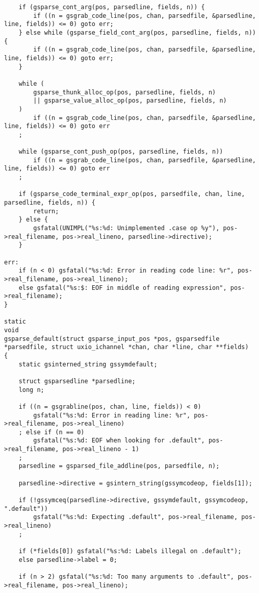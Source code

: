 \documentclass{report}
\begin{document}
\begin{verbatim}
    if (gsparse_cont_arg(pos, parsedline, fields, n)) {
        if ((n = gsgrab_code_line(pos, chan, parsedfile, &parsedline, line, fields)) <= 0) goto err;
    } else while (gsparse_field_cont_arg(pos, parsedline, fields, n)) {
        if ((n = gsgrab_code_line(pos, chan, parsedfile, &parsedline, line, fields)) <= 0) goto err;
    }

    while (
        gsparse_thunk_alloc_op(pos, parsedline, fields, n)
        || gsparse_value_alloc_op(pos, parsedline, fields, n)
    )
        if ((n = gsgrab_code_line(pos, chan, parsedfile, &parsedline, line, fields)) <= 0) goto err
    ;

    while (gsparse_cont_push_op(pos, parsedline, fields, n))
        if ((n = gsgrab_code_line(pos, chan, parsedfile, &parsedline, line, fields)) <= 0) goto err
    ;

    if (gsparse_code_terminal_expr_op(pos, parsedfile, chan, line, parsedline, fields, n)) {
        return;
    } else {
        gsfatal(UNIMPL("%s:%d: Unimplemented .case op %y"), pos->real_filename, pos->real_lineno, parsedline->directive);
    }

err:
    if (n < 0) gsfatal("%s:%d: Error in reading code line: %r", pos->real_filename, pos->real_lineno);
    else gsfatal("%s:$: EOF in middle of reading expression", pos->real_filename);
}

static
void
gsparse_default(struct gsparse_input_pos *pos, gsparsedfile *parsedfile, struct uxio_ichannel *chan, char *line, char **fields)
{
    static gsinterned_string gssymdefault;

    struct gsparsedline *parsedline;
    long n;

    if ((n = gsgrabline(pos, chan, line, fields)) < 0)
        gsfatal("%s:%d: Error in reading line: %r", pos->real_filename, pos->real_lineno)
    ; else if (n == 0)
        gsfatal("%s:%d: EOF when looking for .default", pos->real_filename, pos->real_lineno - 1)
    ;
    parsedline = gsparsed_file_addline(pos, parsedfile, n);

    parsedline->directive = gsintern_string(gssymcodeop, fields[1]);

    if (!gssymceq(parsedline->directive, gssymdefault, gssymcodeop, ".default"))
        gsfatal("%s:%d: Expecting .default", pos->real_filename, pos->real_lineno)
    ;

    if (*fields[0]) gsfatal("%s:%d: Labels illegal on .default");
    else parsedline->label = 0;

    if (n > 2) gsfatal("%s:%d: Too many arguments to .default", pos->real_filename, pos->real_lineno);


\end{verbatim}
\end{document}
